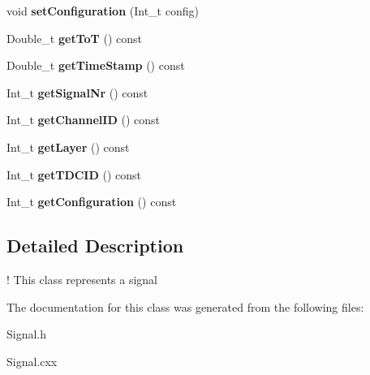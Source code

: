 \begin{DoxyCompactItemize}
\mbox{\label{classSignal_a5bd7e546c5ce4477afd9cf647f6ff03f}} 
void {\bfseries set\+Configuration} (Int\+\_\+t config)
\item 
\mbox{\label{classSignal_af467d738a9974555ab725fb58ce4d186}} 
Double\+\_\+t {\bfseries get\+ToT} () const
\item 
\mbox{\label{classSignal_a4bf1e6f8ee1fb91dcab7edb72c55639e}} 
Double\+\_\+t {\bfseries get\+Time\+Stamp} () const
\item 
\mbox{\label{classSignal_a22faf918354759a61fda90f3de7b270e}} 
Int\+\_\+t {\bfseries get\+Signal\+Nr} () const
\item 
\mbox{\label{classSignal_aa7b068f244676d8085f774d7ffe680c6}} 
Int\+\_\+t {\bfseries get\+Channel\+ID} () const
\item 
\mbox{\label{classSignal_adb766877fb75e231ec7888bf2bb5e653}} 
Int\+\_\+t {\bfseries get\+Layer} () const
\item 
\mbox{\label{classSignal_af8f7707dd8409360f1329415fa6791e2}} 
Int\+\_\+t {\bfseries get\+T\+D\+C\+ID} () const
\item 
\mbox{\label{classSignal_a1ad7aaa899f2f913fd92b8f149f3636a}} 
Int\+\_\+t {\bfseries get\+Configuration} () const
\end{DoxyCompactItemize}


\subsection{Detailed Description}
! This class represents a signal 

The documentation for this class was generated from the following files\+:\begin{DoxyCompactItemize}
\item 
Signal.\+h\item 
Signal.\+cxx\end{DoxyCompactItemize}
